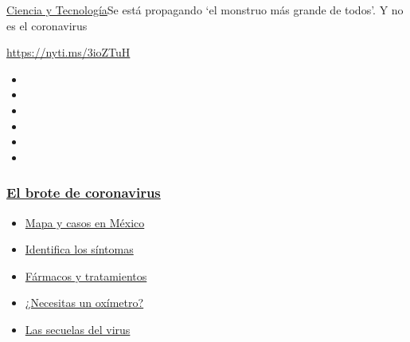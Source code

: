 \href{/es/section/ciencia-y-tecnologia}{Ciencia y
Tecnología}\textbar{}Se está propagando `el monstruo más grande de
todos'. Y no es el coronavirus

\url{https://nyti.ms/3ioZTuH}

\begin{itemize}
\item
\item
\item
\item
\item
\item
\end{itemize}

\hypertarget{el-brote-de-coronavirus}{%
\subsubsection{\texorpdfstring{\href{https://www.nytimes3xbfgragh.onion/es/spotlight/coronavirus?name=styln-coronavirus-es\&region=TOP_BANNER\&variant=undefined\&block=storyline_menu_recirc\&action=click\&pgtype=Article\&impression_id=174ec720-e3a1-11ea-88c0-59664f00d216}{El
brote de
coronavirus}}{El brote de coronavirus}}\label{el-brote-de-coronavirus}}

\begin{itemize}
\tightlist
\item
  \href{https://www.nytimes3xbfgragh.onion/es/interactive/2020/espanol/america-latina/coronavirus-en-mexico.html?name=styln-coronavirus-es\&region=TOP_BANNER\&variant=undefined\&block=storyline_menu_recirc\&action=click\&pgtype=Article\&impression_id=174eee30-e3a1-11ea-88c0-59664f00d216}{Mapa
  y casos en México}
\item
  \href{https://www.nytimes3xbfgragh.onion/es/interactive/2020/08/06/espanol/ciencia-y-tecnologia/tengo-covid-19-sintomas.html?name=styln-coronavirus-es\&region=TOP_BANNER\&variant=undefined\&block=storyline_menu_recirc\&action=click\&pgtype=Article\&impression_id=174eee31-e3a1-11ea-88c0-59664f00d216}{Identifica
  los síntomas}
\item
  \href{https://www.nytimes3xbfgragh.onion/es/interactive/2020/science/coronavirus-tratamientos-curas.html?name=styln-coronavirus-es\&region=TOP_BANNER\&variant=undefined\&block=storyline_menu_recirc\&action=click\&pgtype=Article\&impression_id=174f1540-e3a1-11ea-88c0-59664f00d216}{Fármacos
  y tratamientos}
\item
  \href{https://www.nytimes3xbfgragh.onion/es/2020/04/29/espanol/estilos-de-vida/oximetro-para-que-sirve.html?name=styln-coronavirus-es\&region=TOP_BANNER\&variant=undefined\&block=storyline_menu_recirc\&action=click\&pgtype=Article\&impression_id=174f1541-e3a1-11ea-88c0-59664f00d216}{¿Necesitas
  un oxímetro?}
\item
  \href{https://www.nytimes3xbfgragh.onion/es/2020/07/02/espanol/ciencia-y-tecnologia/sobrevivientes-coronavirus-recuperacion.html?name=styln-coronavirus-es\&region=TOP_BANNER\&variant=undefined\&block=storyline_menu_recirc\&action=click\&pgtype=Article\&impression_id=174f1542-e3a1-11ea-88c0-59664f00d216}{Las
  secuelas del virus}
\end{itemize}

